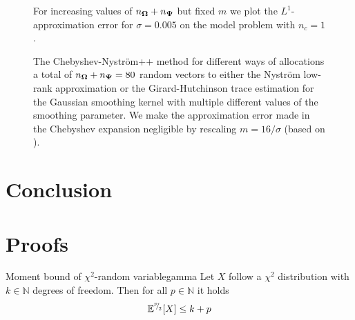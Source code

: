 \documentclass[12pt]{article}
\begin{document}
\begin{figure}[ht]
    \centering
    
    \caption{For increasing values of $n_{\boldsymbol{\Omega}} + n_{\boldsymbol{\Psi}}$ but fixed $m$ we plot the $L^1$-approximation error for $\sigma=0.005$ on the model problem with $n_c = 1$.}
    \label{fig:convergence}
\end{figure}

\begin{figure}[ht]
    \centering
    
    \caption{The Chebyshev-Nyström++ method for different ways of allocations a total of $n_{\boldsymbol{\Omega}} + n_{\boldsymbol{\Psi}}=80$ random vectors to either the Nystr\"om low-rank approximation or the Girard-Hutchinson trace estimation for the Gaussian smoothing kernel with multiple different values of the smoothing parameter. We make the approximation error made in the Chebyshev expansion negligible by rescaling $m=16 / \sigma$ (based on ).}
    \label{fig:distribution}
\end{figure}




\clearpage
\section{Conclusion}
\label{sec:conclusion}



\clearpage
%
\printbibliography

\appendix

\clearpage
\section{Proofs}

\begin{lemma}{Moment bound of $\chi^2$-random variable}{gamma}
    Let $X$ follow a $\chi^2$ distribution with $k \in \mathbb{N}$ degrees of freedom. Then for all $p \in \mathbb{N}$ it holds
    \begin{equation}
        \mathbb{E}^{{}^{p}{\mskip -5mu/\mskip -3mu}_{2}}[X] \leq k + p
    \end{equation}
\end{lemma}
\end{document}
